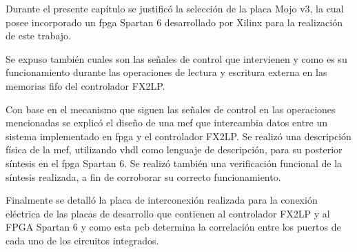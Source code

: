Durante el presente capítulo se justificó la selección de la placa Mojo v3, la cual posee incorporado un \acrshort{fpga} Spartan 6 desarrollado por Xilinx para la realización de este trabajo.

Se expuso también cuales son las señales de control que intervienen y como es su funcionamiento durante las operaciones de lectura y escritura externa en las memorias \acrshort{fifo} del controlador FX2LP.

Con base en el mecanismo que siguen las señales de control en las operaciones mencionadas se explicó el diseño de una \acrshort{mef} que intercambia datos entre un sistema implementado en \acrshort{fpga} y el controlador FX2LP. Se realizó una descripción física de la \acrshort{mef}, utilizando \acrshort{vhdl} como lenguaje de descripción, para su posterior síntesis en el \acrshort{fpga} Spartan 6. Se realizó también una verificación funcional de la síntesis realizada, a fin de corroborar su correcto funcionamiento.

Finalmente se detalló la placa de interconexión realizada para la conexión eléctrica de las placas de desarrollo que contienen al controlador FX2LP y al FPGA Spartan 6 y como esta \acrshort{pcb} determina la correlación entre los puertos de cada uno de los circuitos integrados.